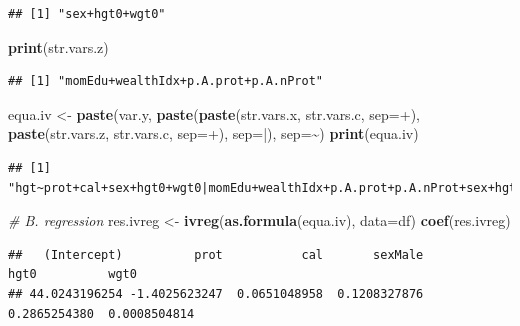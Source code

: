 \documentclass[
]{book}
\newenvironment{Shaded}{\begin{snugshade}}{\end{snugshade}}
\newcommand{\CommentTok}[1]{\textcolor[rgb]{0.56,0.35,0.01}{\textit{#1}}}
\newcommand{\DataTypeTok}[1]{\textcolor[rgb]{0.13,0.29,0.53}{#1}}
\newcommand{\KeywordTok}[1]{\textcolor[rgb]{0.13,0.29,0.53}{\textbf{#1}}}
\newcommand{\NormalTok}[1]{#1}
\newcommand{\StringTok}[1]{\textcolor[rgb]{0.31,0.60,0.02}{#1}}
\begin{document}
\begin{verbatim}
## [1] "sex+hgt0+wgt0"
\end{verbatim}

\begin{Shaded}
\begin{Highlighting}[]
\KeywordTok{print}\NormalTok{(str.vars.z)}
\end{Highlighting}
\end{Shaded}

\begin{verbatim}
## [1] "momEdu+wealthIdx+p.A.prot+p.A.nProt"
\end{verbatim}

\begin{Shaded}
\begin{Highlighting}[]
\NormalTok{equa.iv \textless{}{-}}\StringTok{ }\KeywordTok{paste}\NormalTok{(var.y,}
                 \KeywordTok{paste}\NormalTok{(}\KeywordTok{paste}\NormalTok{(str.vars.x, str.vars.c, }\DataTypeTok{sep=}\StringTok{\textquotesingle{}+\textquotesingle{}}\NormalTok{),}
                       \KeywordTok{paste}\NormalTok{(str.vars.z, str.vars.c, }\DataTypeTok{sep=}\StringTok{\textquotesingle{}+\textquotesingle{}}\NormalTok{),}
                       \DataTypeTok{sep=}\StringTok{\textquotesingle{}|\textquotesingle{}}\NormalTok{),}
                 \DataTypeTok{sep=}\StringTok{\textquotesingle{}\textasciitilde{}\textquotesingle{}}\NormalTok{)}
\KeywordTok{print}\NormalTok{(equa.iv)}
\end{Highlighting}
\end{Shaded}

\begin{verbatim}
## [1] "hgt~prot+cal+sex+hgt0+wgt0|momEdu+wealthIdx+p.A.prot+p.A.nProt+sex+hgt0+wgt0"
\end{verbatim}

\begin{Shaded}
\begin{Highlighting}[]
\CommentTok{\# B. regression}
\NormalTok{res.ivreg \textless{}{-}}\StringTok{ }\KeywordTok{ivreg}\NormalTok{(}\KeywordTok{as.formula}\NormalTok{(equa.iv), }\DataTypeTok{data=}\NormalTok{df)}
\KeywordTok{coef}\NormalTok{(res.ivreg)}
\end{Highlighting}
\end{Shaded}

\begin{verbatim}
##   (Intercept)          prot           cal       sexMale          hgt0          wgt0 
## 44.0243196254 -1.4025623247  0.0651048958  0.1208327876  0.2865254380  0.0008504814
\end{verbatim}
\end{document}
